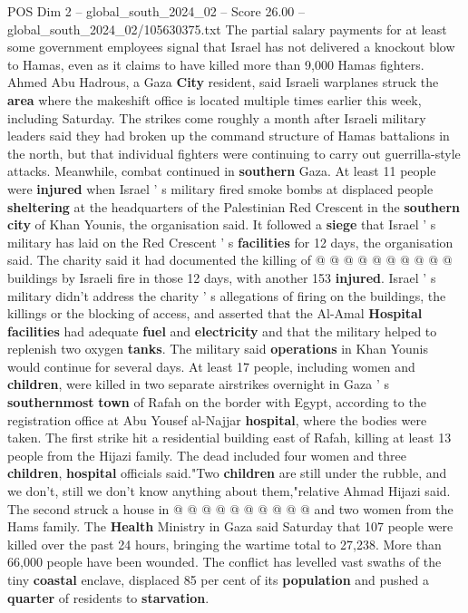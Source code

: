 \begin{textsample}{POS Dim 2 – global\_south\_2024\_02 – Score 26.00 – global\_south\_2024\_02/105630375.txt}
The partial salary payments for at least some government employees signal that Israel has not delivered a knockout blow to Hamas, even as it claims to have killed more than 9,000 Hamas fighters.
Ahmed Abu Hadrous, a Gaza \textbf{City} resident, said Israeli warplanes struck the \textbf{area} where the makeshift office is located multiple times earlier this week, including Saturday.
The strikes come roughly a month after Israeli military leaders said they had broken up the command structure of Hamas battalions in the north, but that individual fighters were continuing to carry out guerrilla-style attacks.
Meanwhile, combat continued in \textbf{southern} Gaza.
At least 11 people were \textbf{injured} when Israel ' s military fired smoke bombs at displaced people \textbf{sheltering} at the headquarters of the Palestinian Red Crescent in the \textbf{southern} \textbf{city} of Khan Younis, the organisation said.
It followed a \textbf{siege} that Israel ' s military has laid on the Red Crescent ' s \textbf{facilities} for 12 days, the organisation said.
The charity said it had documented the killing of @ @ @ @ @ @ @ @ @ @ buildings by Israeli fire in those 12 days, with another 153 \textbf{injured}.
Israel ' s military didn't address the charity ' s allegations of firing on the buildings, the killings or the blocking of access, and asserted that the Al-Amal \textbf{Hospital} \textbf{facilities} had adequate \textbf{fuel} and \textbf{electricity} and that the military helped to replenish two oxygen \textbf{tanks}.
The military said \textbf{operations} in Khan Younis would continue for several days.
At least 17 people, including women and \textbf{children}, were killed in two separate airstrikes overnight in Gaza ' s \textbf{southernmost} \textbf{town} of Rafah on the border with Egypt, according to the registration office at Abu Yousef al-Najjar \textbf{hospital}, where the bodies were taken.
The first strike hit a residential building east of Rafah, killing at least 13 people from the Hijazi family.
The dead included four women and three \textbf{children}, \textbf{hospital} officials said."Two \textbf{children} are still under the rubble, and we don't, still we don't know anything about them,"relative Ahmad Hijazi said.
The second struck a house in @ @ @ @ @ @ @ @ @ @ and two women from the Hams family.
The \textbf{Health} Ministry in Gaza said Saturday that 107 people were killed over the past 24 hours, bringing the wartime total to 27,238.
More than 66,000 people have been wounded.
The conflict has levelled vast swaths of the tiny \textbf{coastal} enclave, displaced 85 per cent of its \textbf{population} and pushed a \textbf{quarter} of residents to \textbf{starvation}.

\end{textsample}
